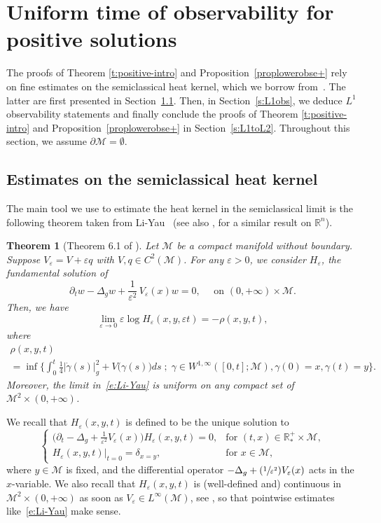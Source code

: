 \documentclass[JEP,XML,SOM,Unicode]{cedram}
\newcommand{\Psfrac}[2]{(\sfrac{#1}{#2})}
\newcommand{\sep}{\;;\;}
\newtheorem{theorem}[lemma]{Theorem}
\theoremstyle{definition}
\newcommand{\M}{\ensuremath{\mathcal M}}
\newcommand{\mb}[1]{\ensuremath{\mathbb{#1}}}
\newcommand{\R}{{\mb{R}}}
\let\d\partial
\let\e\varepsilon
\let\eps\varepsilon
\begin{document}
\section{Uniform time of observability for positive solutions}
\label{s:positive}

The proofs of Theorem \ref{t:positive-intro} and Proposition~\ref{proplowerobse+} rely on fine estimates on the semiclassical heat kernel, which we borrow from~\cite{LY86}. The latter are first presented in Section~\ref{s:Li-Yau}. Then, in Section~\ref{s:L1obs}, we deduce $L^1$ observability statements and finally conclude the proofs of Theorem \ref{t:positive-intro} and Proposition~\ref{proplowerobse+} in Section~\ref{s:L1toL2}.
Throughout this section, we assume $\d\M=\emptyset$.

\subsection{Estimates on the semiclassical heat kernel}
\label{s:Li-Yau}
The main tool we use to estimate the heat kernel in the semiclassical limit is the following theorem taken from Li-Yau~\cite{LY86} (see also \cite{Simon:83}, for a similar result on $\R^{n}$).
\begin{theorem}[Theorem 6.1 of \cite{LY86}]
\label{t:thm-LiYau}
Let $\M$ be a compact manifold without boundary. Suppose $V_\eps = V + \eps q$ with $V,q \in C^2(\M)$. For any $\e>0$, we consider $H_{\e}$, the fundamental solution of
\[
\partial_t w-\Delta_g w+\frac{1}{\e^2}\,V_\eps (x)w=0, \quad \text{ on }(0,+\infty)\times \M.
\]
Then, we have
\begin{equation}
\label{e:Li-Yau}
\underset{\e\to 0}{\lim}\e \log H_{\e}(x,y,\e t)=-\rho(x,y,t),
\end{equation}
where
\begin{multline}
\label{e:def-rho-V}
\rho(x,y,t)\\
= \inf \biggl\{ \int_0^t \frac{1}{4}|\dot{\gamma}(s)|_g^2 +V \big( \gamma(s) \big)ds\sep \gamma \in W^{1,\infty} ([0,t] ; \M ), \gamma(0)=x, \gamma(t)= y \biggr\}.
\end{multline}
Moreover, the limit in~\eqref{e:Li-Yau} is uniform on any compact set of $\M^2\times (0,+\infty)$.
\end{theorem}
We recall that $H_\eps(x,y,t)$ is defined to be the unique solution to
\begin{equation}
\label{e:heat-kernel-def}
\begin{cases}
\Big(\d_t -\Delta_g+\frac{1}{\e^2} V_\eps(x) \Big) H_{\e}(x,y,t)= 0, & \text{for } (t,x) \in \R^+_*\times \M, \\
H_{\e}(x,y,t) |_{t=0} = \delta_{x=y}, & \text{for } x \in \M,
\end{cases}
\end{equation}
where $y \in \M$ is fixed, and the differential operator $ -\Delta_g+\Psfrac{1}{\e^2} V_\eps(x)$ acts in the $x$\nobreakdash-variable.
We also recall that $H_{\e}(x,y,t)$ is (well-defined and) continuous in \hbox{$\M^2\times (0,+\infty)$} as soon as $V_\eps\in L^\infty(\M)$, see \eg \cite[Th.\,B.7.1\,(a$'''$)]{Simon:82}, so that pointwise estimates like~\eqref{e:Li-Yau} make sense.
\end{document}
